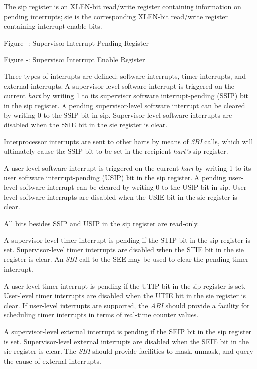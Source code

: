 The sip register is an XLEN-bit read/write register containing
information on pending interrupts; sie is the corresponding XLEN-bit
read/write register containing interrupt enable bits.

\missingfigure{}

Figure ‑: Supervisor Interrupt Pending Register

\missingfigure{}

Figure ‑: Supervisor Interrupt Enable Register

Three types of interrupts are defined: software interrupts, timer
interrupts, and external interrupts. A supervisor-level software
interrupt is triggered on the current \emph{hart} by writing 1 to its
supervisor software interrupt-pending (SSIP) bit in the sip register. A
pending supervisor-level software interrupt can be cleared by writing 0
to the SSIP bit in sip. Supervisor-level software interrupts are
disabled when the SSIE bit in the sie register is clear.

Interprocessor interrupts are sent to other harts by means of \emph{SBI}
calls, which will ultimately cause the SSIP bit to be set in the
recipient \emph{hart's} sip register.

A user-level software interrupt is triggered on the current \emph{hart}
by writing 1 to its user software interrupt-pending (USIP) bit in the
sip register. A pending user-level software interrupt can be cleared by
writing 0 to the USIP bit in sip. User-level software interrupts are
disabled when the USIE bit in the sie register is clear.

All bits besides SSIP and USIP in the sip register are read-only.

A supervisor-level timer interrupt is pending if the STIP bit in the sip
register is set. Supervisor-level timer interrupts are disabled when the
STIE bit in the sie register is clear. An \emph{SBI} call to the SEE may
be used to clear the pending timer interrupt.

A user-level timer interrupt is pending if the UTIP bit in the sip
register is set. User-level timer interrupts are disabled when the UTIE
bit in the sie register is clear. If user-level interrupts are
supported, the \emph{ABI} should provide a facility for scheduling timer
interrupts in terms of real-time counter values.

A supervisor-level external interrupt is pending if the SEIP bit in the
sip register is set. Supervisor-level external interrupts are disabled
when the SEIE bit in the sie register is clear. The \emph{SBI} should
provide facilities to mask, unmask, and query the cause of external
interrupts.

